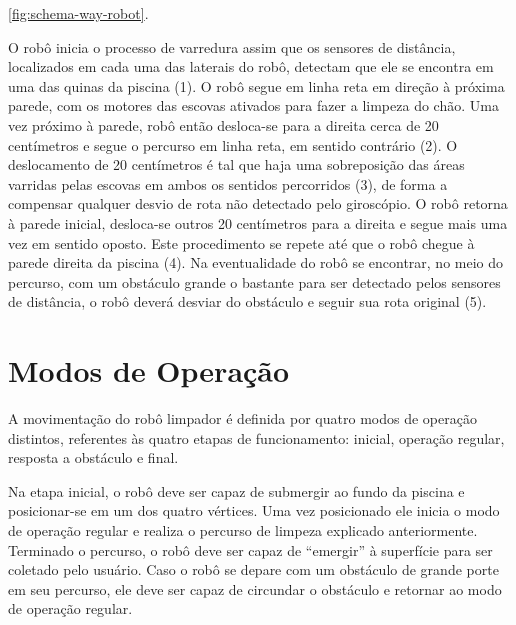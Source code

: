 \ref{fig:schema-way-robot}.
\par
O robô inicia o processo de varredura assim que os sensores de distância,
localizados em cada uma das laterais do robô, detectam que ele se encontra em
uma das quinas da piscina (1).  O robô segue em linha reta em direção à
próxima parede, com os motores das escovas ativados para fazer a limpeza do chão.
Uma vez próximo à parede, robô então desloca-se para a direita cerca de 20
centímetros e segue o percurso em linha reta, em sentido contrário (2). O deslocamento
de 20 centímetros é tal que haja uma sobreposição das áreas varridas pelas escovas
em ambos os sentidos percorridos (3), de forma a compensar qualquer desvio de
rota não detectado pelo giroscópio. O robô retorna à parede inicial, desloca-se
outros 20 centímetros para a direita  e segue mais uma vez em sentido oposto. Este
procedimento se repete até que o robô chegue à parede direita da piscina (4). Na
eventualidade do robô se encontrar, no meio do percurso,  com um obstáculo grande
o bastante para ser detectado pelos sensores de distância, o robô deverá desviar
do obstáculo e seguir sua rota original (5).

\section{Modos de Operação}
A movimentação do robô limpador é definida por quatro modos de operação distintos,
referentes às quatro etapas de funcionamento: inicial, operação regular,
resposta a obstáculo e final.
\par
Na etapa inicial, o robô deve ser capaz de submergir ao fundo da piscina e
posicionar-se em um dos quatro vértices. Uma vez posicionado ele inicia o modo
de operação regular e realiza o percurso de limpeza  explicado anteriormente.
Terminado o percurso, o robô deve ser capaz de “emergir” à superfície para ser
coletado pelo usuário. Caso o robô se depare com um obstáculo de grande porte
em seu percurso, ele deve ser capaz de circundar o obstáculo e retornar ao modo de
operação regular.

